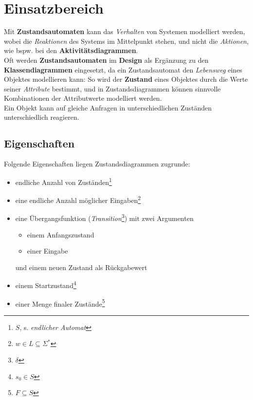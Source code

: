 \section{Einsatzbereich}

Mit \textbf{Zustandsautomaten} kann das \textit{Verhalten} von Systemen modelliert werden, wobei die \textit{Reaktionen} des Systems im Mittelpunkt stehen, und nicht die \textit{Aktionen}, wie bspw. bei den \textbf{Aktivitätsdiagrammen}.\\

\noindent
Oft werden \textbf{Zustandsautomaten} im \textbf{Design} als Ergänzung zu den \textbf{Klassendiagrammen} eingesetzt, da ein Zustandsautomat den \textit{Lebensweg} eines Objektes modellieren kann: So wird der \textbf{Zustand} eines Objektes durch die Werte seiner \textit{Attribute} bestimmt, und in Zustandsdiagrammen können sinnvolle Kombinationen der Attributwerte modelliert werden.\\
Ein Objekt kann auf gleiche Anfragen in unterschiedlichen Zuständen unterschiedlich reagieren.\\

\subsection*{Eigenschaften}

Folgende Eigenschaften liegen Zustandsdiagrammen zugrunde:

\begin{itemize}
    \item endliche Anzahl von Zuständen\footnote{$S$, s. \textit{endlicher Automat}}
    \item eine endliche Anzahl möglicher Eingaben\footnote{$w \in L \subseteq \Sigma^*$}
    \item eine Übergangsfunktion (\textit{Transition}\footnote{$\delta$}) mit zwei Argumenten
    \begin{itemize}
        \item einem Anfangszustand
        \item einer Eingabe
    \end{itemize}
    \noindent
    und einem neuen Zustand als Rückgabewert
    \item einem Startzustand\footnote{$s_0 \in S$}
    \item einer Menge finaler Zustände\footnote{$F \subseteq S$}
\end{itemize}